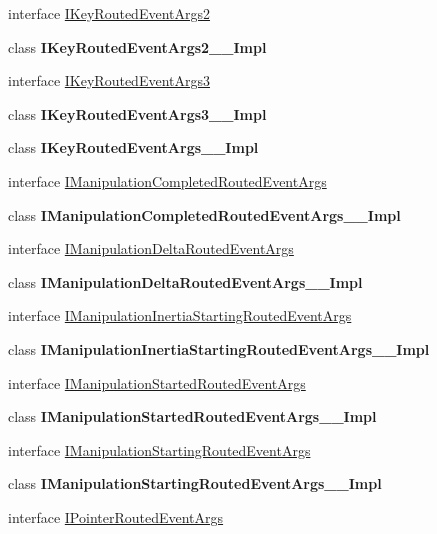 \begin{DoxyCompactItemize}
\item 
interface \hyperlink{interface_windows_1_1_u_i_1_1_xaml_1_1_input_1_1_i_key_routed_event_args2}{I\+Key\+Routed\+Event\+Args2}
\item 
class {\bfseries I\+Key\+Routed\+Event\+Args2\+\_\+\+\_\+\+Impl}
\item 
interface \hyperlink{interface_windows_1_1_u_i_1_1_xaml_1_1_input_1_1_i_key_routed_event_args3}{I\+Key\+Routed\+Event\+Args3}
\item 
class {\bfseries I\+Key\+Routed\+Event\+Args3\+\_\+\+\_\+\+Impl}
\item 
class {\bfseries I\+Key\+Routed\+Event\+Args\+\_\+\+\_\+\+Impl}
\item 
interface \hyperlink{interface_windows_1_1_u_i_1_1_xaml_1_1_input_1_1_i_manipulation_completed_routed_event_args}{I\+Manipulation\+Completed\+Routed\+Event\+Args}
\item 
class {\bfseries I\+Manipulation\+Completed\+Routed\+Event\+Args\+\_\+\+\_\+\+Impl}
\item 
interface \hyperlink{interface_windows_1_1_u_i_1_1_xaml_1_1_input_1_1_i_manipulation_delta_routed_event_args}{I\+Manipulation\+Delta\+Routed\+Event\+Args}
\item 
class {\bfseries I\+Manipulation\+Delta\+Routed\+Event\+Args\+\_\+\+\_\+\+Impl}
\item 
interface \hyperlink{interface_windows_1_1_u_i_1_1_xaml_1_1_input_1_1_i_manipulation_inertia_starting_routed_event_args}{I\+Manipulation\+Inertia\+Starting\+Routed\+Event\+Args}
\item 
class {\bfseries I\+Manipulation\+Inertia\+Starting\+Routed\+Event\+Args\+\_\+\+\_\+\+Impl}
\item 
interface \hyperlink{interface_windows_1_1_u_i_1_1_xaml_1_1_input_1_1_i_manipulation_started_routed_event_args}{I\+Manipulation\+Started\+Routed\+Event\+Args}
\item 
class {\bfseries I\+Manipulation\+Started\+Routed\+Event\+Args\+\_\+\+\_\+\+Impl}
\item 
interface \hyperlink{interface_windows_1_1_u_i_1_1_xaml_1_1_input_1_1_i_manipulation_starting_routed_event_args}{I\+Manipulation\+Starting\+Routed\+Event\+Args}
\item 
class {\bfseries I\+Manipulation\+Starting\+Routed\+Event\+Args\+\_\+\+\_\+\+Impl}
\item 
interface \hyperlink{interface_windows_1_1_u_i_1_1_xaml_1_1_input_1_1_i_pointer_routed_event_args}{I\+Pointer\+Routed\+Event\+Args}
\item 

\end{DoxyCompactItemize}
